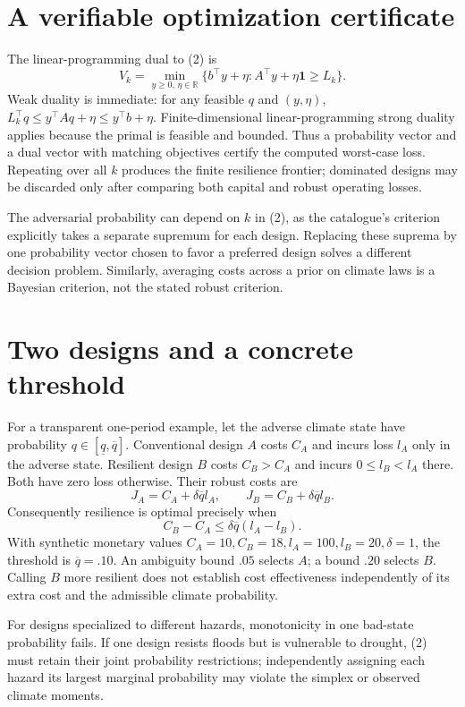 \documentclass[11pt]{article}
\newcommand{\R}{\mathbb R}
\begin{document}
\section*{A verifiable optimization certificate}
The linear-programming dual to (2) is
\[
 V_k=\min_{y\geq0,\,\eta\in\R}
 \{b^\top y+\eta:A^\top y+\eta\mathbf{1}\geq L_k\}. \tag{3}
\]
Weak duality is immediate: for any feasible $q$ and $(y,\eta)$,
$L_k^\top q\leq y^\top Aq+\eta\leq y^\top b+\eta$.
Finite-dimensional linear-programming strong duality applies because the primal is feasible and bounded. Thus a probability vector and a dual vector with matching objectives certify the computed worst-case loss. Repeating over all $k$ produces the finite resilience frontier; dominated designs may be discarded only after comparing both capital and robust operating losses.

The adversarial probability can depend on $k$ in (2), as the catalogue's criterion explicitly takes a separate supremum for each design. Replacing these suprema by one probability vector chosen to favor a preferred design solves a different decision problem. Similarly, averaging costs across a prior on climate laws is a Bayesian criterion, not the stated robust criterion.

\section*{Two designs and a concrete threshold}
For a transparent one-period example, let the adverse climate state have probability $q\in[\underline q,\overline q]$. Conventional design $A$ costs $C_A$ and incurs loss $l_A$ only in the adverse state. Resilient design $B$ costs $C_B>C_A$ and incurs $0\leq l_B<l_A$ there. Both have zero loss otherwise. Their robust costs are
\[
 J_A=C_A+\delta\overline q l_A,\qquad
 J_B=C_B+\delta\overline q l_B.
\]
Consequently resilience is optimal precisely when
\[
 C_B-C_A\leq\delta\overline q(l_A-l_B).                \tag{4}
\]
With synthetic monetary values $C_A=10,C_B=18,l_A=100,l_B=20,\delta=1$, the threshold is $\overline q=.10$. An ambiguity bound $.05$ selects $A$; a bound $.20$ selects $B$. Calling $B$ more resilient does not establish cost effectiveness independently of its extra cost and the admissible climate probability.

For designs specialized to different hazards, monotonicity in one bad-state probability fails. If one design resists floods but is vulnerable to drought, (2) must retain their joint probability restrictions; independently assigning each hazard its largest marginal probability may violate the simplex or observed climate moments.
\end{document}
